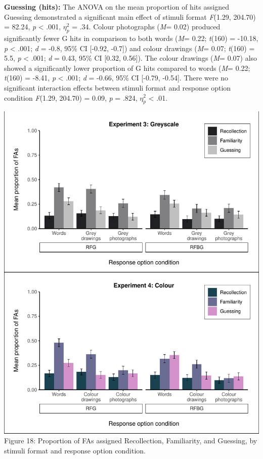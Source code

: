 \documentclass[
  11pt,
]{article}
\begin{document}
\textbf{Guessing (hits):} The ANOVA on the mean proportion of hits
assigned Guessing demonstrated a significant main effect of stimuli
format \emph{F}(1.29, 204.70) = 82.24, \emph{p} \textless{} .001,
\(\eta^2_p\) = .34. Colour photographs (\emph{M}= 0.02) produced
significantly fewer G hits in comparison to both words (\emph{M}= 0.22;
\emph{t}(160) = -10.18, \emph{p} \textless{} .001; \emph{d} = -0.8, 95\%
CI {[}-0.92, -0.7{]}) and colour drawings (\emph{M}= 0.07; \emph{t}(160)
= 5.5, \emph{p} \textless{} .001; \emph{d} = 0.43, 95\% CI {[}0.32,
0.56{]}). The colour drawings (\emph{M}= 0.07) also showed a
significantly lower proportion of G hits compared to words (\emph{M}=
0.22; \emph{t}(160) = -8.41, \emph{p} \textless{} .001; \emph{d} =
-0.66, 95\% CI {[}-0.79, -0.54{]}. There were no significant interaction
effects between stimuli format and response option condition
\emph{F}(1.29, 204.70) = 0.09, \emph{p} = .824, \(\eta^2_p\) \textless{}
.01.

\includegraphics{R--Thesis_files/figure-latex/unnamed-chunk-57-1.pdf}
Figure 18: Proportion of FAs assigned Recollection, Familiarity, and
Guessing, by stimuli format and response option condition.
\end{document}
